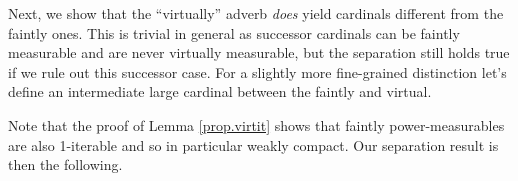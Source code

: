 \documentclass[../../main]{subfiles}
\begin{document}
\qquad Next, we show that the ``virtually'' adverb \textit{does} yield cardinals different from the faintly ones. This is trivial in general as successor cardinals can be faintly measurable and are never virtually measurable, but the separation still holds true if we rule out this successor case. For a slightly more fine-grained distinction let's define an intermediate large cardinal between the faintly and virtual.


Note that the proof of Lemma \ref{prop.virtit} shows that faintly power-measurables are also 1-iterable and so in particular weakly compact. Our separation result is then the following.
\end{document}

